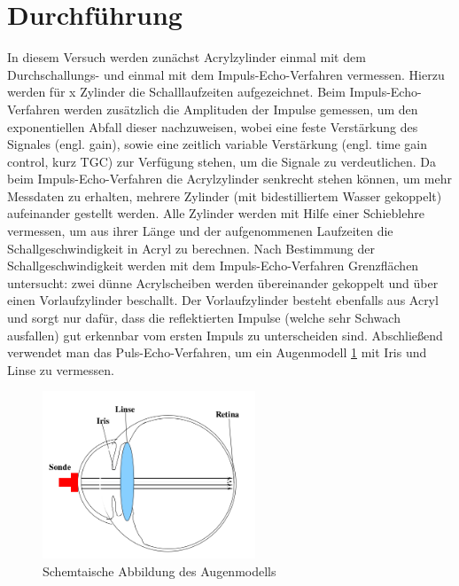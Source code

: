\section{Durchführung}
\label{sec:Durchführung}
In diesem Versuch werden zunächst Acrylzylinder einmal mit dem Durchschallungs-
und einmal mit dem Impuls-Echo-Verfahren vermessen. Hierzu werden für x Zylinder
die Schalllaufzeiten aufgezeichnet. Beim Impuls-Echo-Verfahren werden zusätzlich
die Amplituden der Impulse gemessen, um den exponentiellen Abfall dieser
nachzuweisen, wobei eine feste Verstärkung des Signales (engl. gain), sowie eine
zeitlich variable Verstärkung (engl. time gain control, kurz TGC) zur Verfügung
stehen, um die Signale zu verdeutlichen. Da beim Impuls-Echo-Verfahren die
Acrylzylinder senkrecht stehen können, um mehr Messdaten zu erhalten, mehrere
Zylinder (mit bidestilliertem Wasser gekoppelt) aufeinander gestellt werden.
Alle Zylinder werden mit Hilfe einer Schieblehre vermessen, um aus ihrer Länge
und der aufgenommenen Laufzeiten die Schallgeschwindigkeit in Acryl zu berechnen.
Nach Bestimmung der Schallgeschwindigkeit werden mit dem Impuls-Echo-Verfahren
Grenzflächen untersucht: zwei dünne Acrylscheiben werden übereinander gekoppelt
und über einen Vorlaufzylinder beschallt. Der Vorlaufzylinder besteht ebenfalls
aus Acryl und sorgt nur dafür, dass die reflektierten Impulse
(welche sehr Schwach ausfallen) gut erkennbar vom ersten Impuls zu unterscheiden
sind.
Abschließend verwendet man das Puls-Echo-Verfahren, um ein Augenmodell \ref{fig:augm} mit
Iris und Linse zu vermessen.
\begin{figure}
  \centering
  \includegraphics[height=5cm]{logos/Augenmodell.png}
  \caption{Schemtaische Abbildung des Augenmodells}
  \label{fig:augm}
\end{figure}
